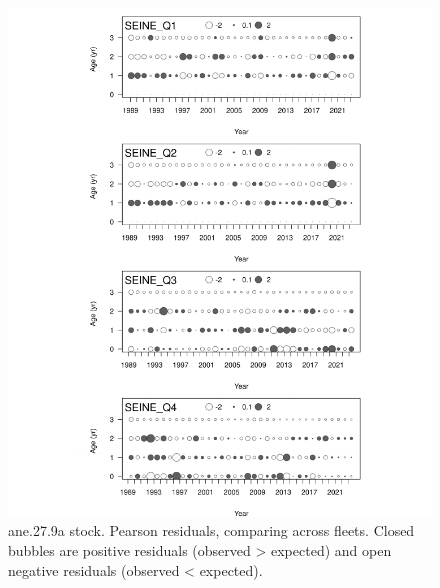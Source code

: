 \documentclass[
]{article}
\begin{document}
\begin{figure}[H]

{\centering \includegraphics[width=0.95\linewidth]{Report_SS3_quarter_with_age_data_MR_prueba_mod_files/figure-latex/unnamed-chunk-26-1} 

}

\caption{ane.27.9a stock.  Pearson residuals, comparing across fleets. Closed bubbles are positive residuals (observed > expected) and open negative residuals (observed < expected).}\label{fig:unnamed-chunk-26}
\end{figure}
\end{document}
